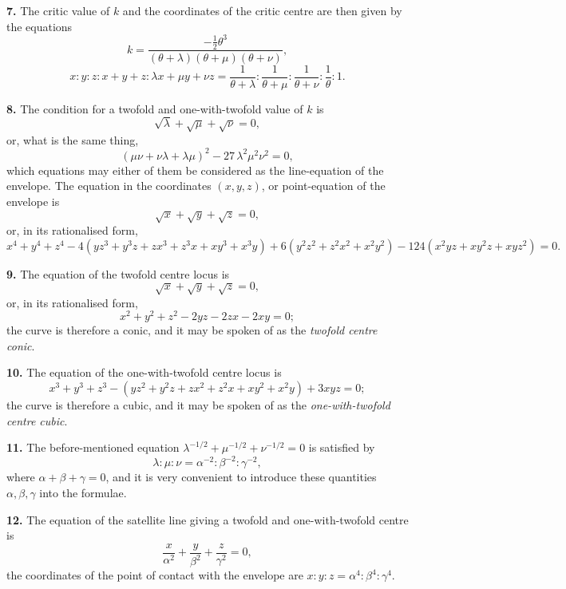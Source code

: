 \documentclass[11pt,a4paper]{article}
\begin{document}
\medskip

\textbf{7.} The critic value of $k$ and the coordinates of the critic centre are then given by the equations
\[
k = \frac{-\tfrac{1}{2}\theta^3}{(\theta + \lambda)(\theta + \mu)(\theta + \nu)},
\]
\[
x : y : z : x + y + z : \lambda x + \mu y + \nu z = \frac{1}{\theta + \lambda} : \frac{1}{\theta + \mu} : \frac{1}{\theta + \nu} : \frac{1}{\theta} : 1.
\]

\medskip

\textbf{8.} The condition for a twofold and one-with-twofold value of $k$ is
\[
\sqrt{\lambda} + \sqrt{\mu} + \sqrt{\nu} = 0,
\]
or, what is the same thing,
\[
(\mu\nu + \nu\lambda + \lambda\mu)^2 - 27\,\lambda^2\mu^2\nu^2 = 0,
\]
which equations may either of them be considered as the line-equation of the envelope. The equation in the coordinates $(x, y, z)$, or point-equation of the envelope is
\[
\sqrt{x} + \sqrt{y} + \sqrt{z} = 0,
\]
or, in its rationalised form,
\[
x^4 + y^4 + z^4 - 4(yz^3 + y^3 z + zx^3 + z^3 x + xy^3 + x^3 y) + 6(y^2 z^2 + z^2 x^2 + x^2 y^2) - 124(x^2 yz + xy^2 z + xyz^2) = 0.
\]

\medskip

\textbf{9.} The equation of the twofold centre locus is
\[
\sqrt{x} + \sqrt{y} + \sqrt{z} = 0,
\]
or, in its rationalised form,
\[
x^2 + y^2 + z^2 - 2yz - 2zx - 2xy = 0;
\]
the curve is therefore a conic, and it may be spoken of as the \emph{twofold centre conic}.

\medskip

\textbf{10.} The equation of the one-with-twofold centre locus is
\[
x^3 + y^3 + z^3 - (yz^2 + y^2 z + zx^2 + z^2 x + xy^2 + x^2 y) + 3xyz = 0;
\]
the curve is therefore a cubic, and it may be spoken of as the \emph{one-with-twofold centre cubic}.

\medskip

\textbf{11.} The before-mentioned equation $\lambda^{-1/2} + \mu^{-1/2} + \nu^{-1/2} = 0$ is satisfied by
\[
\lambda : \mu : \nu = \alpha^{-2} : \beta^{-2} : \gamma^{-2},
\]
where $\alpha + \beta + \gamma = 0$, and it is very convenient to introduce these quantities $\alpha, \beta, \gamma$ into the formulae.

\medskip

\textbf{12.} The equation of the satellite line giving a twofold and one-with-twofold centre is
\[
\frac{x}{\alpha^2} + \frac{y}{\beta^2} + \frac{z}{\gamma^2} = 0,
\]
the coordinates of the point of contact with the envelope are $x : y : z = \alpha^4 : \beta^4 : \gamma^4$.
\end{document}
